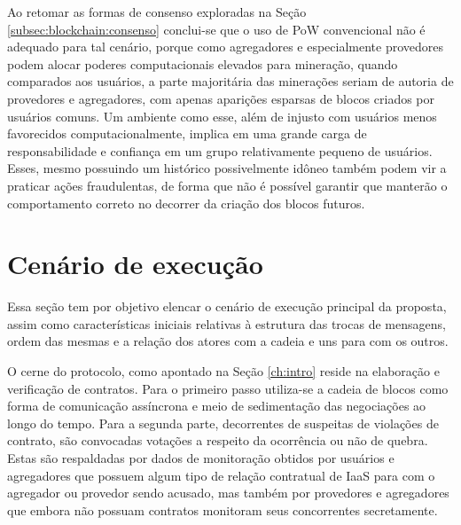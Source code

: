 %
Ao retomar as formas de consenso exploradas na Seção \ref{subsec:blockchain:consenso} conclui-se que o uso de \ac{PoW} convencional não é adequado para tal cenário, porque como agregadores e especialmente provedores podem alocar poderes computacionais elevados para mineração, quando comparados aos usuários, a parte majoritária das minerações seriam de autoria de provedores e agregadores, com apenas aparições esparsas de blocos criados por usuários comuns. Um ambiente como esse, além de injusto com usuários menos favorecidos computacionalmente, implica em uma grande carga de responsabilidade e confiança em um grupo relativamente pequeno de usuários. Esses, mesmo possuindo um histórico possivelmente idôneo também podem vir a praticar ações fraudulentas, de forma que não é possível garantir que manterão o comportamento correto no decorrer da criação dos blocos futuros.

\section{Cenário de execução}
\label{sec:cenario_execucao}

Essa seção tem por objetivo elencar o cenário de execução principal da proposta, assim como características iniciais relativas à estrutura das trocas de mensagens, ordem das mesmas e a relação dos atores com a cadeia e uns para com os outros.

%
O cerne do protocolo, como apontado na Seção \ref{ch:intro} reside na elaboração e verificação de contratos. Para o primeiro passo utiliza-se a cadeia de blocos como forma de comunicação assíncrona e meio de sedimentação das negociações ao longo do tempo. Para a segunda parte, decorrentes de suspeitas de violações de contrato, são convocadas votações a respeito da ocorrência ou não de quebra. Estas são respaldadas por dados de monitoração obtidos por usuários e agregadores que possuem algum tipo de relação contratual de \ac{IaaS} para com o agregador ou provedor sendo acusado, mas também por provedores e agregadores que embora não possuam contratos monitoram seus concorrentes secretamente.

